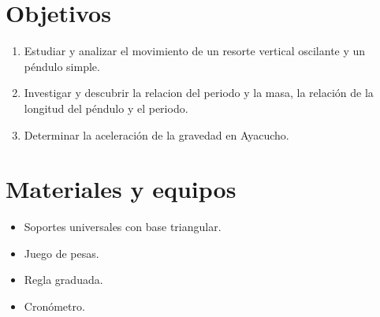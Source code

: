 \begin{center}
	\underline{\Large\scshape\bfseries \dytema}
\end{center}
\section{Objetivos}
\begin{enumerate}[label=\itemcirccz{azzul}{\arabic*},itemsep=2pt]
	\item Estudiar y analizar el movimiento de un resorte vertical oscilante y un péndulo simple.
	\item Investigar y descubrir la relacion del periodo y la masa, la relación de la longitud del péndulo y el periodo.
	\item Determinar la aceleración de la gravedad en Ayacucho.
\end{enumerate}
\section{Materiales y equipos}
\begin{itemize}[label=\textbf{$\bullet$},itemsep=2pt]
	\item Soportes universales con base triangular.
	\item Juego de pesas.
	\item Regla graduada.
	\item Cronómetro.
\end{itemize}

